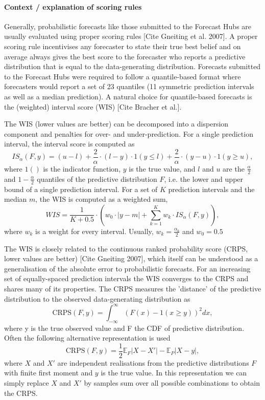 \documentclass{article}
\begin{document}

\paragraph{Context / explanation of scoring rules}
Generally, probabilistic forecasts like those submitted to the Forecast Hubs are usually evaluated using proper scoring rules [Cite Gneiting et al. 2007]. A proper scoring rule incentivises any forecaster to state their true best belief and on average always gives the best score to the forecaster who reports a predictive distribution that is equal to the data-generating distribution. Forecasts submitted to the Forecast Hubs were required to follow a quantile-based format where forecasters would report a set of 23 quantiles (11 symmetric prediction intervals as well as a median prediction). A natural choice for quantile-based forecasts is the (weighted) interval score (WIS) [Cite Bracher et al.]. 

The WIS (lower values are better) can be decomposed into a dispersion component and penalties for over- and under-prediction. For a single prediction interval, the interval score is computed as 
$$IS_\alpha(F,y) = (u-l) + \frac{2}{\alpha} \cdot (l-y) \cdot 1(y \leq l) + \frac{2}{\alpha} \cdot (y-u) \cdot 1(y \geq u), $$ 
where $1()$ is the indicator function, $y$ is the true value, and $l$ and $u$ are the $\frac{\alpha}{2}$ and $1 - \frac{\alpha}{2}$ quantiles of the predictive distribution $F$, i.e. the lower and upper bound of a single prediction interval. For a set of $K$ prediction intervals and the median $m$, the WIS is computed as a weighted sum, 
$$WIS = \frac{1}{K + 0.5} \cdot (w_0 \cdot |y - m| + \sum_{k = 1}^{K} w_k \cdot IS_{\alpha}(F, y)),$$ 
where $w_k$ is a weight for every interval. Usually, $w_k = \frac{\alpha_k}{2}$ and $w_0 = 0.5$

The WIS is closely related to the continuous ranked probability score (CRPS, lower values are better) [Cite Gneiting 2007], which itself can be understood as a generalisation of the absolute error to probabilistic forecasts. For an increasing set of equally-spaced prediction intervals the WIS converges to the CRPS and shares many of its properties. The CRPS measures the 'distance' of the predictive distribution to the observed data-generating distribution as 
$$\text{CRPS}(F, y) = \int_{-\infty}^\infty \left( F(x) - 1(x \geq y) \right)^2 dx,$$
where y is the true observed value and F the CDF of predictive distribution. Often the following alternative representation is used
$$ \text{CRPS}(F, y) = \frac{1}{2} \mathbb{E}_{F} |X - X'| - \mathbb{E}_P |X - y|,$$ 
where $X$ and $X'$ are independent realisations from the predictive distributions $F$ with finite first moment and $y$ is the true value. In this representation we can simply replace $X$ and $X'$ by samples sum over all possible combinations to obtain the CRPS.  
\end{document}
